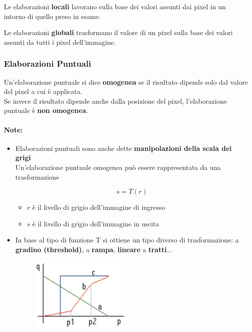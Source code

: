 \begin{definition}
    Le elaborazioni \textbf{locali} lavorano sulla base dei valori assunti dai pixel in
    un intorno di quello preso in esame.
\end{definition}

\begin{definition}
    Le elaborazioni \textbf{globali} trasformano il valore di un pixel sulla
    base dei valori assunti da tutti i pixel dell'immagine.
\end{definition}

\subsubsection{Elaborazioni Puntuali}

\begin{definition}
    Un'elaborazione puntuale si dice \textbf{omogenea} se il risultato
    dipende solo dal valore del pixel a cui è applicata.\\
    Se invece il risultato dipende anche dalla posizione del pixel,
    l'elaborazione puntuale è \textbf{non omogenea}.
\end{definition}

\paragraph{Note:}

\begin{itemize}
    \item Elaborazioni puntuali sono anche dette \textbf{manipolazioni della scala dei
              grigi}\\
          Un'elaborazione puntuale omogenea può essere rappresentata da
          una trasformazione

          $$
              s = T(r)
          $$

          \begin{itemize}
              \item $r$ è il livello di grigio dell'immagine di ingresso
              \item $s$ è il livello di grigio dell'immagine in uscita
          \end{itemize}
    \item In base al tipo di funzione T si ottiene un tipo diverso di
          trasformazione: a \textbf{gradino (threshold)}, a \textbf{rampa},
          \textbf{lineare} a \textbf{tratti}...

          \begin{figure}[H]
              \centering
              \includegraphics[width=5cm, keepaspectratio]{capitoli/immagini/imgs/elaborazioni_puntuali_immagine.jpg}
          \end{figure}

\end{itemize}

